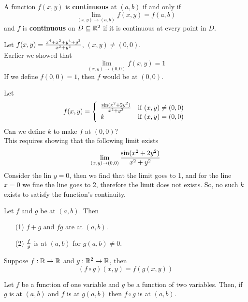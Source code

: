 \documentclass[english, 11pt]{article}
\begin{document}
  \begin{defn}[continuous]\label{continuous}
    A function $f(x,y)$ is \textbf{continuous} at $(a,b)$ if and only if
    \[ \lim_{(x,y)\rightarrow(a,b)} f(x,y) = f(a,b) \]
    and $f$ is \textbf{continuous} on $D \subseteq {\mathbb{R}}^2$ if it is continuous at every point in $D$.
  \end{defn}

  \begin{exmp}
    Let $f(x,y) = \frac{x^4+x^2+y^4+y^2}{x^2+y^2}$, $(x,y) \not = (0,0)$. \\
    Earlier we showed that
    \[ \lim_{(x,y)\rightarrow(0,0)} f(x,y) = 1 \]
    If we define $f(0,0) = 1$, then $f$ would be  at $(0,0)$.
  \end{exmp}

  \begin{exmp}
    Let
    \[ f(x,y) = \left\{ \begin{array}{lr} \frac{\sin(x^2 + 2y^2)}{x^2+y^2} & \mbox{if $(x,y) \not = (0,0)$} \\ k & \mbox{if $(x,y) = (0,0)$} \end{array} \right. \]
    Can we define $k$ to make $f$  at $(0,0)$?\\
    This requires showing that the following limit exists
    \[ \lim_{(x,y)\rightarrow(0,0)} \frac{\sin(x^2+2y^2)}{x^2+y^2} \]
    Consider the lin $y = 0$, then we find that the limit goes to 1, and for the line $x=0$ we fine the line goes to 2, therefore the limit does not exists. So, no such $k$ exists to satisfy the function's continuity.
  \end{exmp}

  \begin{defn}\label{continuitytheorem}
    Let $f$ and $g$ be  at $(a,b)$. Then
    \begin{itemize}
      \item[(1)] $f+g$ and $fg$ are  at $(a,b)$.
      \item[(2)] $\frac{f}{g}$ is  at $(a,b)$ for $g(a,b) \not = 0$.
    \end{itemize}
  \end{defn}

  \begin{defn}\label{composition}
  Suppose $f : {\mathbb{R}} \rightarrow {\mathbb{R}}$ and $g : {\mathbb{R}}^2 \rightarrow {\mathbb{R}}$, then
    \[ (f\circ g)(x,y) = f(g(x,y)) \]
  \end{defn}

  \begin{defn}
    Let $f$ be a function of one variable and $g$ be a function of two variables. Then, if $g$ is  at $(a,b)$ and $f$ is  at $g(a,b)$ then $f\circ g$ is  at $(a,b)$.
  \end{defn}
\end{document}
